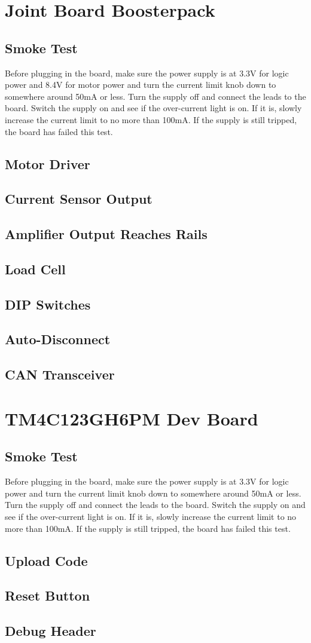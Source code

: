 \documentclass[12pt,letterpaper]{article}
\begin{document}
	\newpage
	\section{Joint Board Boosterpack}
	\subsection{Smoke Test}
	Before plugging in the board, make sure the power supply is at 3.3V for logic power and 8.4V for motor power and turn the current limit knob down to somewhere around 50mA or less. Turn the supply off and connect the leads to the board. Switch the supply on and see if the over-current light is on. If it is, slowly increase the current limit to no more than 100mA. If the supply is still tripped, the board has failed this test.
	
	\subsection{Motor Driver}
	\subsection{Current Sensor Output}
	\subsection{Amplifier Output Reaches Rails}
	\subsection{Load Cell}
	\subsection{DIP Switches}
	\subsection{Auto-Disconnect}
	\subsection{CAN Transceiver}
	
	\newpage
	\section{TM4C123GH6PM Dev Board}
	\subsection{Smoke Test}
	Before plugging in the board, make sure the power supply is at 3.3V for logic power and turn the current limit knob down to somewhere around 50mA or less. Turn the supply off and connect the leads to the board. Switch the supply on and see if the over-current light is on. If it is, slowly increase the current limit to no more than 100mA. If the supply is still tripped, the board has failed this test.
	
	\subsection{Upload Code}
	\subsection{Reset Button}
	\subsection{Debug Header}
	
\end{document}
